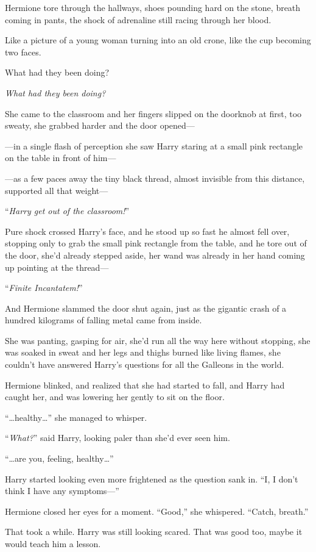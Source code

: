 \later

Hermione tore through the hallways, shoes pounding hard on the stone, breath coming in pants, the shock of adrenaline still racing through her blood.

Like a picture of a young woman turning into an old crone, like the cup becoming two faces.

What had they been doing?

\emph{What had they been doing?}

She came to the classroom and her fingers slipped on the doorknob at first, too sweaty, she grabbed harder and the door opened—

—in a single flash of perception she saw Harry staring at a small pink rectangle on the table in front of him—

—as a few paces away the tiny black thread, almost invisible from this distance, supported all that weight—

“\emph{Harry get out of the classroom!}”

Pure shock crossed Harry’s face, and he stood up so fast he almost fell over, stopping only to grab the small pink rectangle from the table, and he tore out of the door, she’d already stepped aside, her wand was already in her hand coming up pointing at the thread—

“\emph{Finite Incantatem!}”

And Hermione slammed the door shut again, just as the gigantic crash of a hundred kilograms of falling metal came from inside.

She was panting, gasping for air, she’d run all the way here without stopping, she was soaked in sweat and her legs and thighs burned like living flames, she couldn’t have answered Harry’s questions for all the Galleons in the world.

Hermione blinked, and realized that she had started to fall, and Harry had caught her, and was lowering her gently to sit on the floor.

“…healthy…” she managed to whisper.

“\emph{What?}” said Harry, looking paler than she’d ever seen him.

“…are you, feeling, healthy…”

Harry started looking even more frightened as the question sank in. “I, I don’t think I have any symptoms—”

Hermione closed her eyes for a moment. “Good,” she whispered. “Catch, breath.”

That took a while. Harry was still looking scared. That was good too, maybe it would teach him a lesson.

